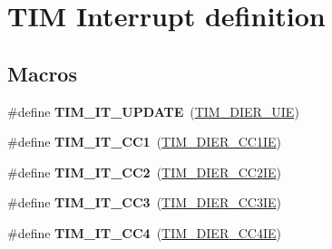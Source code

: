 \hypertarget{group___t_i_m___interrupt__definition}{}\section{T\+IM Interrupt definition}
\label{group___t_i_m___interrupt__definition}
\subsection*{Macros}
\begin{DoxyCompactItemize}
\item 
\mbox{\label{group___t_i_m___interrupt__definition_ga6a48ecf88cae0402ff084202bfdd4f8e}} 
\#define {\bfseries T\+I\+M\+\_\+\+I\+T\+\_\+\+U\+P\+D\+A\+TE}~(\mbox{\hyperlink{group___peripheral___registers___bits___definition_ga5c6d3e0495e6c06da4bdd0ad8995a32b}{T\+I\+M\+\_\+\+D\+I\+E\+R\+\_\+\+U\+IE}})
\item 
\mbox{\label{group___t_i_m___interrupt__definition_ga02267a938ab4722c5013fffa447cf5a6}} 
\#define {\bfseries T\+I\+M\+\_\+\+I\+T\+\_\+\+C\+C1}~(\mbox{\hyperlink{group___peripheral___registers___bits___definition_ga1ba7f7ca97eeaf6cc23cd6765c6bf678}{T\+I\+M\+\_\+\+D\+I\+E\+R\+\_\+\+C\+C1\+IE}})
\item 
\mbox{\label{group___t_i_m___interrupt__definition_ga60f6b6c424b62ca58d3fafd8f5955e4f}} 
\#define {\bfseries T\+I\+M\+\_\+\+I\+T\+\_\+\+C\+C2}~(\mbox{\hyperlink{group___peripheral___registers___bits___definition_ga757c59b690770adebf33e20d3d9dec15}{T\+I\+M\+\_\+\+D\+I\+E\+R\+\_\+\+C\+C2\+IE}})
\item 
\mbox{\label{group___t_i_m___interrupt__definition_ga6aef020aebafd9e585283fbbaf8b841f}} 
\#define {\bfseries T\+I\+M\+\_\+\+I\+T\+\_\+\+C\+C3}~(\mbox{\hyperlink{group___peripheral___registers___bits___definition_ga4edf003f04bcf250bddf5ed284201c2e}{T\+I\+M\+\_\+\+D\+I\+E\+R\+\_\+\+C\+C3\+IE}})
\item 
\mbox{\label{group___t_i_m___interrupt__definition_ga1dce7f1bc32a258f2964cb7c05f413a6}} 
\#define {\bfseries T\+I\+M\+\_\+\+I\+T\+\_\+\+C\+C4}~(\mbox{\hyperlink{group___peripheral___registers___bits___definition_ga6ad0f562a014572793b49fe87184338b}{T\+I\+M\+\_\+\+D\+I\+E\+R\+\_\+\+C\+C4\+IE}})

\end{DoxyCompactItemize}
